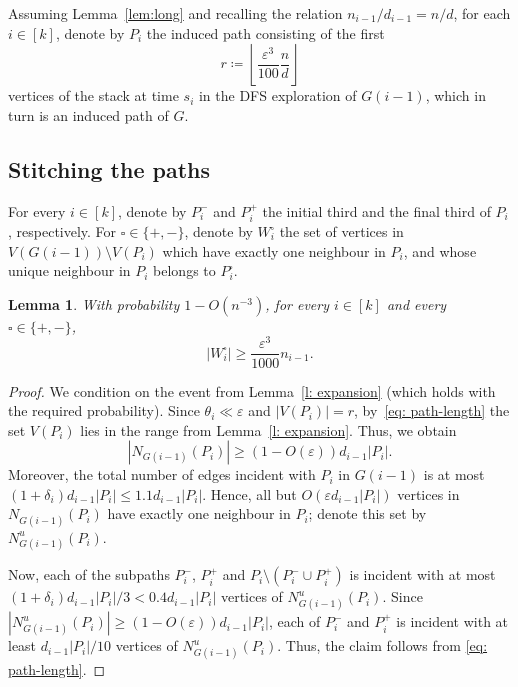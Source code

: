 \documentclass[reqno,a4paper]{amsart}
\newtheorem{lemma}[theorem]{Lemma}
\theoremstyle{definition}
\newcommand{\eps}{\varepsilon}
\begin{document}
Assuming Lemma~\ref{lem:long} and recalling the relation $n_{i-1}/d_{i-1}=n/d$, for each $i\in[k]$, denote by $P_i$ the induced path consisting of the first
\begin{equation}\label{eq: path-length}
    r\coloneq \left\lfloor\frac{\eps^3}{100}\frac{n}{d}\right\rfloor
\end{equation}
vertices of the stack at time $s_i$ in the DFS exploration of $G(i-1)$, which in turn is an induced path of $G$.

\subsection{Stitching the paths}\label{s: stitch}
For every $i\in[k]$, denote by $P_i^-$ and $P_i^+$ the initial third and the final third of $P_i$, respectively. 
For $\square\in\{+,-\}$, denote by $W_i^\square$ the set of vertices in $V(G(i-1))\setminus V(P_i)$ which have exactly one neighbour in $P_i$, and whose unique neighbour in $P_i$ belongs to $P_i^\square$.

\begin{lemma}\label{lem:many-leaves}
With probability $1-O(n^{-3})$, for every $i\in[k]$ and every $\square\in\{+,-\}$,
\[
    |W_i^\square|\ge \frac{\eps^3}{1000}n_{i-1}.
\]
\end{lemma}

\begin{proof}
We condition on the event from Lemma~\ref{l: expansion} (which holds with the required probability).
Since $\theta_i\ll\eps$ and $|V(P_i)|=r$, by~\eqref{eq: path-length} the set $V(P_i)$ lies in the range from Lemma~\ref{l: expansion}. Thus, we obtain
\[
    |N_{G(i-1)}(P_i)|\ge (1-O(\eps))d_{i-1}|P_i|.
\]
Moreover, the total number of edges incident with $P_i$ in $G(i-1)$ is at most $(1+\delta_i)d_{i-1}|P_i|\le 1.1 d_{i-1} |P_i|$. 
Hence, all but $O(\eps d_{i-1}|P_i|)$ vertices in $N_{G(i-1)}(P_i)$ have exactly one neighbour in $P_i$; denote this set by $N_{G(i-1)}^u(P_i)$.

Now, each of the subpaths $P_i^-$, $P_i^+$ and $P_i\setminus(P_i^-\cup P_i^+)$ is incident with at most $(1+\delta_i)d_{i-1}|P_i|/3 < 0.4d_{i-1}|P_i|$ vertices of $N_{G(i-1)}^u(P_i)$. Since $|N_{G(i-1)}^u(P_i)|\ge (1-O(\eps))d_{i-1}|P_i|$, each of $P_i^-$ and $P_i^+$ is incident with at least $d_{i-1}|P_i|/10$ vertices of $N_{G(i-1)}^u(P_i)$. Thus, the claim follows from \eqref{eq: path-length}.
\end{proof}
\end{document}
